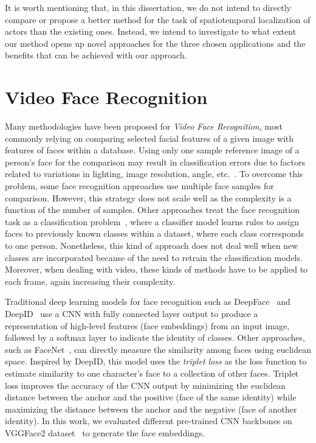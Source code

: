 It is worth mentioning that, in this dissertation, we do not intend to directly compare or propose a better method for the task of spatiotemporal localization of actors than the existing ones. Instead, we intend to investigate to what extent our method opens up novel approaches for the three chosen applications and the benefits that can be achieved with our approach.

\section{Video Face Recognition}
\label{sec:video_face}

Many methodologies have been proposed for \emph{Video Face Recognition}, most commonly relying on comparing selected facial features of a given image with features of faces within a database.
Using only one sample reference image of a person's face for the comparison may result in classification errors due to factors related to variations in lighting, image resolution, angle, etc.~\cite{598229}.
To overcome this problem, some face recognition approaches use multiple face samples for comparison. However, this strategy does not scale well as the complexity is a function of the number of samples.
Other approaches treat the face recognition task as a classification problem~\cite{dadi2016improved, ghosal}, where a classifier model learns rules to assign faces to previously known classes within a dataset, where each class corresponds to one person.
Nonetheless, this kind of approach does not deal well when new classes are incorporated because of the need to retrain the classification models.
Moreover, when dealing with video, these kinds of methods have to be applied to each frame, again increasing their complexity.


Traditional deep learning models for face recognition such as DeepFace~\cite{taigman2014deepface} and DeepID~\cite{sun2014deep} use a CNN with fully connected layer output to produce a representation of high-level features (face embeddings) from an input image, followed by a softmax layer to indicate the identity of classes. Other approaches, such as FaceNet~\cite{schroff2015facenet}, can directly measure the similarity among faces using euclidean space. Inspired by DeepID, this model uses the \textit{triplet loss} as the loss function to estimate similarity to one character's face to a  collection of other faces. Triplet loss improves the accuracy of the  CNN output by minimizing the euclidean distance between the anchor and the positive (face of the same identity) while maximizing the distance between the anchor and the negative (face of another identity). In this work, we evaluated different pre-trained CNN backbones on VGGFace2 dataset~\cite{cao2018vggface2} to generate the face embeddings. 

